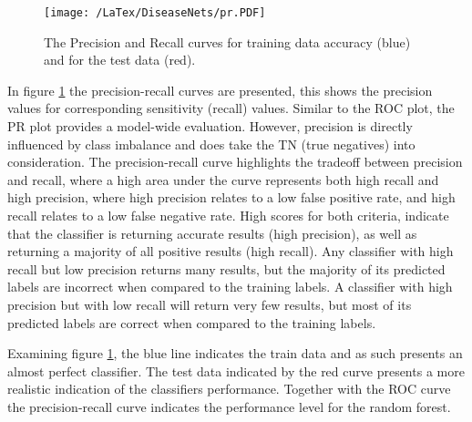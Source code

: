 \documentclass[a4paper,8pt,twocolumn,5p]{elsarticle}
\begin{document}
\begin{figure}[h]
\centering
\texttt{[image: /LaTex/DiseaseNets/pr.PDF]} %
\centering \caption{The Precision and Recall curves for training data accuracy (blue) and for the test data (red).}
\label{pr1}
\end{figure}

In figure \ref{pr1} the precision-recall curves are presented, this shows the precision values for corresponding sensitivity (recall) values. Similar to the ROC plot, the PR plot provides a model-wide evaluation. However, precision is directly influenced by class imbalance and does take the TN (true negatives) into consideration. The precision-recall curve highlights the tradeoff between precision and recall, where a high area under the curve represents both high recall and high precision, where high precision relates to a low false positive rate, and high recall relates to a low false negative rate. High scores for both criteria, indicate that the classifier is returning accurate results (high precision), as well as returning a majority of all positive results (high recall). Any classifier with high recall but low precision returns many results, but the majority of its predicted labels are incorrect when compared to the training labels. A classifier with high precision but with low recall will return very few results, but most of its predicted labels are correct when compared to the training labels. 

Examining figure \ref{pr1}, the blue line  indicates the train data and as such presents an almost perfect classifier. The test data indicated by the red curve presents a more realistic indication of the classifiers performance. Together with the ROC curve the precision-recall curve indicates the performance level for the  random forest.
\end{document}
